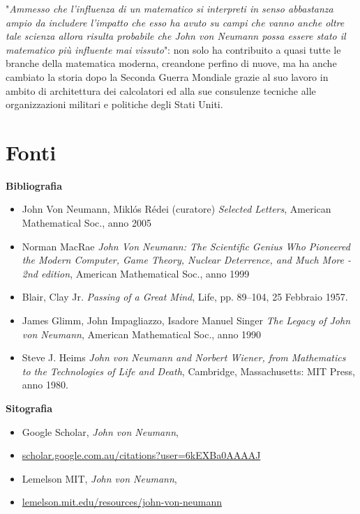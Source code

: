 \documentclass[a4paper, 12pt]{article}
\begin{document}
"\textit{Ammesso che l'influenza di un matematico si interpreti in senso abbastanza ampio da includere l'impatto che esso ha avuto su campi che vanno anche oltre tale scienza allora risulta probabile che John von Neumann possa essere stato il matematico più influente mai vissuto}": non solo ha contribuito a quasi tutte le branche della matematica moderna, creandone perfino di nuove, ma ha anche cambiato la storia dopo la Seconda Guerra Mondiale grazie al suo lavoro in ambito di architettura dei calcolatori ed alla sue consulenze tecniche alle organizzazioni militari e politiche degli Stati Uniti.


\clearpage





\clearpage

\section{Fonti}

{\large \textbf{Bibliografia}\par}
\begin{itemize}
    \item John Von Neumann, Miklós Rédei (curatore) \textit{Selected Letters}, American Mathematical Soc., anno 2005
    \item Norman MacRae \textit{John Von Neumann: The Scientific Genius Who Pioneered the Modern Computer, Game Theory, Nuclear Deterrence, and Much More - 2nd edition}, American Mathematical Soc., anno 1999
    \item Blair, Clay Jr. \textit{Passing of a Great Mind}, Life, pp. 89–104, 25 Febbraio 1957.
    \item James Glimm, John Impagliazzo, Isadore Manuel Singer \textit{The Legacy of John von Neumann}, American Mathematical Soc., anno 1990
    \item Steve J. Heims \textit{John von Neumann and Norbert Wiener, from Mathematics to the Technologies of Life and Death}, Cambridge, Massachusetts: MIT Press, anno 1980.
\end{itemize}

{\noindent \large \textbf{Sitografia}\par}
\begin{itemize}
    \item Google Scholar, \textit{John von Neumann},
    \item[] \href{https://scholar.google.com.au/citations?user=6kEXBa0AAAAJ}{scholar.google.com.au/citations?user=6kEXBa0AAAAJ}
    
    \item Lemelson MIT, \textit{John von Neumann},
    \item[] \href{https://lemelson.mit.edu/resources/john-von-neumann}
    {lemelson.mit.edu/resources/john-von-neumann}
    
\end{itemize}
\end{document}
